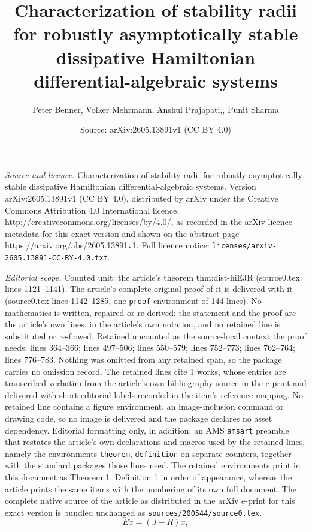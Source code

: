 \documentclass[10pt,a4paper]{amsart}
\title{Characterization of stability radii for robustly asymptotically stable dissipative Hamiltonian differential-algebraic systems}
\author{Peter Benner, Volker Mehrmann, Anshul Prajapati,, Punit Sharma}
\date{Source: arXiv:2605.13891v1 (CC BY 4.0)}
\begin{document}
\maketitle

\noindent\emph{Source and licence.} Characterization of stability radii for robustly asymptotically stable dissipative Hamiltonian differential-algebraic systems. Version arXiv:2605.13891v1 (CC BY 4.0), distributed by arXiv under the Creative Commons Attribution 4.0 International licence, http://creativecommons.org/licenses/by/4.0/, as recorded in the arXiv licence metadata for this exact version and shown on the abstract page https://arxiv.org/abs/2605.13891v1. Full licence notice: \texttt{licenses/arxiv-2605.13891-CC-BY-4.0.txt}.\par\smallskip

\noindent\textit{Editorial scope.} Counted unit: the article's theorem thm:dist-hiEJR (source0.tex lines 1121--1141). The article's complete original proof of it is delivered with it (source0.tex lines 1142--1285, one \texttt{proof} environment of 144 lines). No mathematics is written, repaired or re-derived: the statement and the proof are the article's own lines, in the article's own notation, and no retained line is substituted or re-flowed.  Retained uncounted as the source-local context the proof needs: lines 364--366; lines 497--506; lines 550--579; lines 752--773; lines 762--764; lines 776--783.  Nothing was omitted from any retained span, so the package carries no omission record.  The retained lines cite 1 works, whose entries are transcribed verbatim from the article's own bibliography source in the e-print and delivered with short editorial labels recorded in the item's reference mapping.  No retained line contains a figure environment, an image-inclusion command or drawing code, so no image is delivered and the package declares no asset dependency.  Editorial formatting only, in addition: an AMS \texttt{amsart} preamble that restates the article's own declarations and macros used by the retained lines, namely the environments \texttt{theorem}, \texttt{definition} on separate counters, together with the standard packages those lines need.  The retained environments print in this document as Theorem 1, Definition 1 in order of appearance, whereas the article prints the same items with the numbering of its own full document.  The complete native source of the article as distributed in the arXiv e-print for this exact version is bundled unchanged as \texttt{sources/200544/source0.tex}.
\begin{equation}\label{dhdae1}
E\dot x=(J-R) x,
\end{equation}
\end{document}
